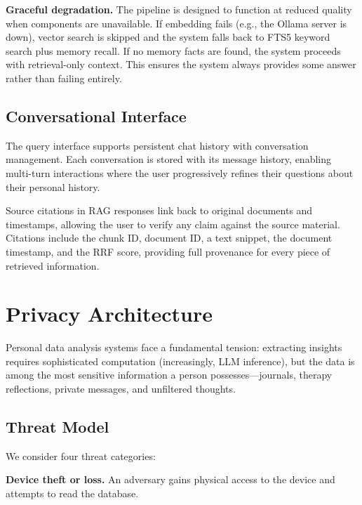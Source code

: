 \documentclass[manuscript,review]{acmart}
\begin{document}
\textbf{Graceful degradation.}
The pipeline is designed to function at reduced quality when components are unavailable.
If embedding fails (e.g., the Ollama server is down), vector search is skipped and the system falls back to FTS5 keyword search plus memory recall.
If no memory facts are found, the system proceeds with retrieval-only context.
This ensures the system always provides some answer rather than failing entirely.

\subsection{Conversational Interface}
\label{sec:conversational}

The query interface supports persistent chat history with conversation management.
Each conversation is stored with its message history, enabling multi-turn interactions where the user progressively refines their questions about their personal history.

Source citations in RAG responses link back to original documents and timestamps, allowing the user to verify any claim against the source material.
Citations include the chunk ID, document ID, a text snippet, the document timestamp, and the RRF score, providing full provenance for every piece of retrieved information.


\section{Privacy Architecture}
\label{sec:privacy}

Personal data analysis systems face a fundamental tension: extracting insights requires sophisticated computation (increasingly, LLM inference), but the data is among the most sensitive information a person possesses---journals, therapy reflections, private messages, and unfiltered thoughts.

\subsection{Threat Model}
\label{sec:threat-model}

We consider four threat categories:

\textbf{Device theft or loss.}
An adversary gains physical access to the device and attempts to read the database.
\end{document}
